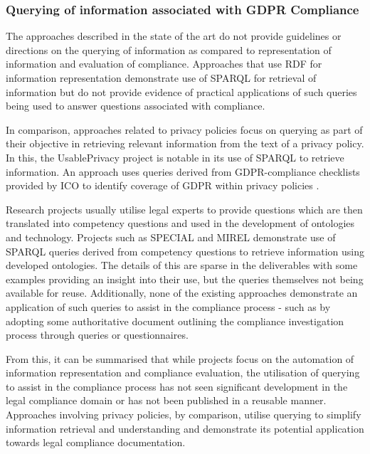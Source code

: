 \subsubsection{Querying of information associated with GDPR Compliance}
The approaches described in the state of the art do not provide guidelines or directions on the querying of information as compared to representation of information and evaluation of compliance. Approaches that use RDF for information representation demonstrate use of SPARQL for retrieval of information but do not provide evidence of practical applications of such queries being used to answer questions associated with compliance.

In comparison, approaches related to privacy policies focus on querying as part of their objective in retrieving relevant information from the text of a privacy policy. In this, the UsablePrivacy project is notable in its use of SPARQL to retrieve information. An approach uses queries derived from GDPR-compliance checklists provided by ICO to identify coverage of GDPR within privacy policies \cite{linden_privacy_2018}.

Research projects usually utilise legal experts to provide questions which are then translated into competency questions and used in the development of ontologies and technology. Projects such as SPECIAL and MIREL demonstrate use of SPARQL queries derived from competency questions to retrieve information using developed ontologies. The details of this are sparse in the deliverables with some examples providing an insight into their use, but the queries themselves not being available for reuse. Additionally, none of the existing approaches demonstrate an application of such queries to assist in the compliance process - such as by adopting some authoritative document outlining the compliance investigation process through queries or questionnaires.

From this, it can be summarised that while projects focus on the automation of information representation and compliance evaluation, the utilisation of querying to assist in the compliance process has not seen significant development in the legal compliance domain or has not been published in a reusable manner. Approaches involving privacy policies, by comparison, utilise querying to simplify information retrieval and understanding and demonstrate its potential application towards legal compliance documentation.

